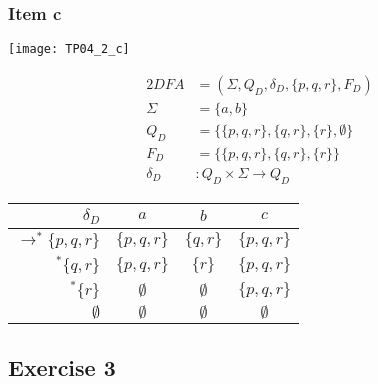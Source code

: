 {\subsubsection{Item c} \label{sssec:TP04_2_c}
\begin{center} \texttt{[image: TP04\_2\_c]} \end{center}
\begin{center}
\begin{minipage}[c]{0.35\textwidth}
\begin{alignat*}{2}
	DFA       &= (\Sigma, Q_D, \delta_D, \{p,q,r\}, F_D)\\
	\Sigma    &= \{a,b\}\\
	Q_D       &= \{\{p,q,r\},\{q,r\},\{r\},\emptyset\}\\
	F_D       &= \{\{p,q,r\},\{q,r\},\{r\}\}\\
	\delta_D &\colon Q_D \times \Sigma \rightarrow Q_D
\end{alignat*}
\end{minipage}%
\begin{minipage}[c]{0.45\textwidth}
\begin{center}
\begin{tabular}{ r | c c c }
    $\delta_D$ & $a$ & $b$ & $c$ \\ \hline
    $\rightarrow^\ast \{p,q,r\}$ & $\{p,q,r\}$ & $\{  q,r\}$ & $\{p,q,r\}$ \\
    $           ^\ast \{  q,r\}$ & $\{p,q,r\}$ & $\{    r\}$ & $\{p,q,r\}$ \\
    $           ^\ast \{    r\}$ & $\emptyset$ & $\emptyset$ & $\{p,q,r\}$\\
    $ \emptyset                $ & $\emptyset$ & $\emptyset$ & $\emptyset$
\end{tabular}
\end{center}
\end{minipage}
\end{center}
\subsection{Exercise 3}
}
